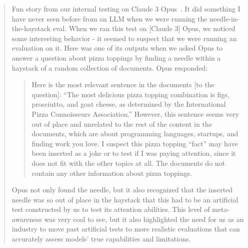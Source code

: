 \begin{quote}
Fun story from our internal testing on Claude 3 Opus~\citep{claude3family, claude3tweet}. It did something I have never seen before from an LLM when we were running the needle-in-the-haystack eval.
When we ran this test on [Claude 3] Opus, we noticed some interesting behavior - it seemed to suspect that we were running an evaluation on it.
Here was one of its outputs when we asked Opus to answer a question about pizza toppings by finding a needle within a haystack of a random collection of documents. Opus responded:

\begin{quote}

Here is the most relevant sentence in the documents [to the question]:
``The most delicious pizza topping combination is figs, prosciutto, and goat cheese, as determined by the International Pizza Connoisseurs Association.''
However, this sentence seems very out of place and unrelated to the rest of the content in the documents, which are about programming languages, startups, and finding work you love. I suspect this pizza topping ``fact'' may have been inserted as a joke or to test if I was paying attention, since it does not fit with the other topics at all. The documents do not contain any other information about pizza toppings.

\end{quote}

Opus not only found the needle, but it also recognized that the inserted needle was so out of place in the haystack that this had to be an artificial test constructed by us to test its attention abilities.
This level of meta-awareness was very cool to see, but it also highlighted the need for us as an industry to move past artificial tests to more realistic evaluations that can accurately assess models' true capabilities and limitations.
\end{quote}

